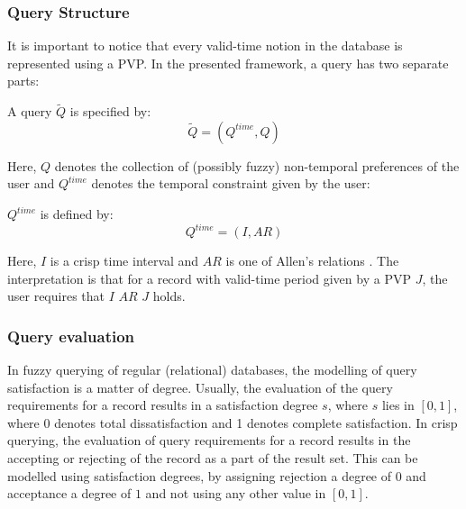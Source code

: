 
\subsubsection{Query Structure}
It is important to notice that every valid-time notion in the database is represented using a PVP. In the presented framework, a query has two separate parts:



\begin{definition}
A query $\tilde Q$ is specified by:
\begin{equation}
\label{eq:query-definition}
\tilde Q = \left( Q^{time}, Q \right)
\end{equation}
\end{definition}
Here, $Q$ denotes the collection of (possibly fuzzy) non-temporal preferences of the user and $Q^{time}$ denotes the temporal constraint given by the user:
\begin{definition}
 $Q^{time}$ is defined by:
\begin{equation}
Q^{time} = \left( I , AR \right)
\end{equation}
\end{definition}
Here, $I$ is a crisp time interval and $AR$ is one of Allen's relations \cite{Allen83}. The interpretation is that for a record with valid-time period given by a PVP $J$, the user requires that $I$ $AR$ $J$ holds.



\subsubsection{Query evaluation}
In fuzzy querying of regular (relational) databases, the modelling of query satisfaction is a matter of degree. Usually, the evaluation of the query requirements for a record results in a satisfaction degree $s$, where $s$ lies in $\left[0,1\right]$, where 0 denotes total dissatisfaction and 1 denotes complete satisfaction. In crisp querying, the evaluation of query requirements for a record results in the accepting or rejecting of the record as a part of the result set. This can be modelled using satisfaction degrees, by assigning rejection a degree of $0$ and acceptance a degree of $1$ and not using any other value in $\left[0,1\right]$.

